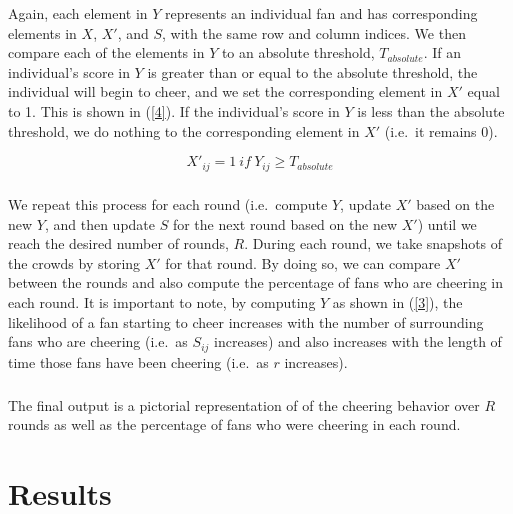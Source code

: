 \documentclass[oneside,12pt]{report}
\def\prefacesection#1{
\chapter*{#1}
\addcontentsline{toc}{chapter}{#1}
}
\begin{document}
Again, each element in $Y$ represents an individual fan and has corresponding elements in $X$, $X'$, and $S$, with the same row and column indices. We then compare each of the elements in $Y$ to an absolute threshold, $T_{absolute}$. If an individual's score in $Y$ is greater than or equal to the absolute threshold, the individual will begin to cheer, and we set the corresponding element in $X'$ equal to 1. This is shown in (\ref{4}). If the individual's score in $Y$ is less than the absolute threshold, we do nothing to the corresponding element in $X'$ (i.e.~it remains 0).  

\begin{equation}
X'_{ij}=1~if~Y_{ij}\geq T_{absolute}
\label{4}
\end{equation}

\paragraph{}
We repeat this process for each round (i.e.~compute $Y$, update $X'$ based on the new $Y$, and then update $S$ for the next round based on the new $X'$) until we reach the desired number of rounds, $R$. During each round, we take snapshots of the crowds by storing $X'$ for that round. By doing so, we can compare $X'$ between the rounds and also compute the percentage of fans who are cheering in each round. It is important to note, by computing $Y$ as shown in (\ref{3}), the likelihood of a fan starting to cheer increases with the number of surrounding fans who are cheering (i.e.~as $S_{ij}$ increases) and also increases with the length of time those fans have been cheering (i.e.~as $r$ increases).

\paragraph{}
The final output is a pictorial representation of of the cheering behavior over $R$ rounds as well as the percentage of fans who were cheering in each round.

\prefacesection{Results}
\end{document}
